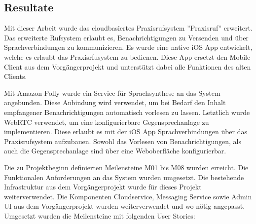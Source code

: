 \subsection{Resultate}

Mit dieser Arbeit wurde das cloudbasiertes Praxisrufsystem ''Praxisruf'' erweitert.
Das erweiterte Rufsystem erlaubt es, Benachrichtigungen zu Versenden und über Sprachverbindungen zu kommunizieren.
Es wurde eine native iOS App entwickelt, welche es erlaubt das Praxisrfusystem zu bedienen.
Diese App ersetzt den Mobile Client aus dem Vorgängerprojekt und unterstützt dabei alle Funktionen des alten Clients.

Mit Amazon Polly wurde ein Service für Sprachsynthese an das System angebunden.
Diese Anbindung wird verwendet, um bei Bedarf den Inhalt empfangener Benachrichtigungen automatisch vorlesen zu lassen.
Letztlich wurde WebRTC verwendet, um eine konfigurierbare Gegensprechanlage zu implementieren.
Diese erlaubt es mit der iOS App Sprachverbindungen über das Praxisrufsystem aufzubauen.
Sowohl das Vorlesen von Benachrichtigungen, als auch die Gegensprechanlage sind über eine Weboberfläche konfigurierbar.

Die zu Projektbeginn definierten Meilensteine M01 bis M08 wurden erreicht.
Die Funktionalen Anforderungen an das System wurden umgesetzt.
Die bestehende Infrastruktur aus dem Vorgängerprojekt wurde für dieses Projekt weiterverwendet.
Die Komponenten Cloudservice, Messaging Service sowie Admin UI aus dem Vorgängerprojekt wurden weiterverwendet und wo nötig angepasst.
Umgesetzt wurden die Meilensteine mit folgenden User Stories:

